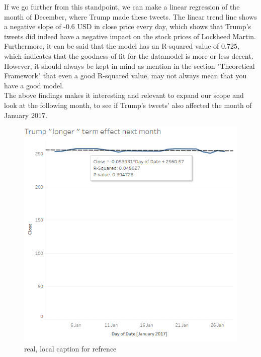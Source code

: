 \documentclass[11pt]{article}
\begin{document}
If we go further from this standpoint, we can make a linear regression of the month of December, where Trump made these tweets. The linear trend line shows a negative slope of -0.6 USD in close price every day, which shows that Trump's tweets did indeed have a negative impact on the stock prices of Lockheed Martin. Furthermore, it can be said that the model has an R-squared value of 0.725, which indicates that the goodness-of-fit for the datamodel is more or less decent. However, it should always be kept in mind as mention in the section "Theoretical Framework" that even a good R-squared value, may not always mean that you have a good model. \\

The above findings makes it interesting and relevant to expand our scope and look at the following month, to see if Trump's tweets' also affected the month of January 2017.

\begin{figure}[H] %
	\centering %
\includegraphics [scale= .6]  {TrumpJanuaryEffect.PNG}    %
	\caption[Optional caption] {real, local caption for refrence}
	\label{fig:wordcloudBliz}

\end{figure}
\end{document}
